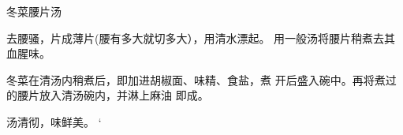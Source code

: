 \begin{recipe}{冬菜腰片汤}

\ingredients




\cooking

去腰骚，片成薄片(腰有多大就切多大），用清水漂起。 用一般汤将腰片稍煮去其血腥味。

冬菜在清汤内稍煮后，即加进胡椒面、味精、食盐，煮 开后盛入碗中。再将煮过的腰片放入清汤碗内，并淋上麻油 即成。

\notes

汤清彻，味鲜美。	‘

\end{recipe}

